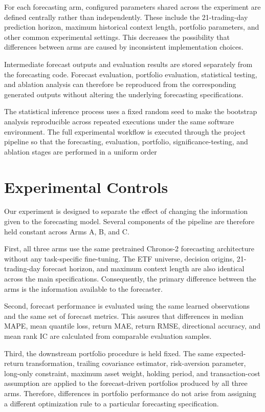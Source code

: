 \documentclass[12pt,a4paper,twoside,openany]{book}
\begin{document}
For each forecasting arm, configured parameters shared across the experiment are defined centrally rather than independently. These
include the 21-trading-day prediction horizon, maximum historical
context length, portfolio parameters, and other common experimental
settings. This decreases the possibility that differences between arms
are caused by inconsistent implementation choices.

Intermediate forecast outputs and evaluation results are stored
separately from the forecasting code. Forecast evaluation, portfolio
evaluation, statistical testing, and ablation analysis can therefore
be reproduced from the corresponding generated outputs without
altering the underlying forecasting specifications.

The statistical inference process uses a fixed random seed to make
the bootstrap analysis reproducible across repeated executions under
the same software environment. The full experimental workflow is
executed through the project pipeline so that the forecasting,
evaluation, portfolio, significance-testing, and ablation stages are
performed in a uniform order

\section{Experimental Controls}\label{experimental-controls}

Our experiment is designed to separate the effect of changing the
information given to the forecasting model. Several components of the pipeline are therefore held constant across Arms A, B, and C.

First, all three arms use the same pretrained Chronos-2 forecasting
architecture without any task-specific fine-tuning. The ETF universe,
decision origins, 21-trading-day forecast horizon, and maximum context
length are also identical across the main specifications. Consequently,
the primary difference between the arms is the information available
to the forecaster.

Second, forecast performance is evaluated using the same learned
observations and the same set of forecast metrics. This assures that
differences in median MAPE, mean quantile loss, return MAE, return
RMSE, directional accuracy, and mean rank IC are calculated from
comparable evaluation samples.

Third, the downstream portfolio procedure is held fixed. The same
expected-return transformation, trailing covariance estimator,
risk-aversion parameter, long-only constraint, maximum asset weight,
holding period, and transaction-cost assumption are applied to the
forecast-driven portfolios produced by all three arms. Therefore, differences in portfolio performance do not arise from assigning a
different optimization rule to a particular forecasting
specification.
\end{document}
